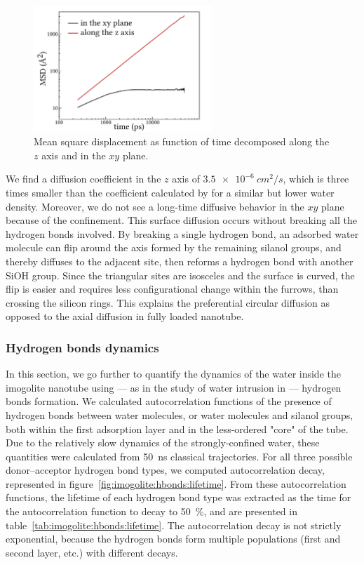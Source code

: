 \documentclass[thesis]{subfiles}
\begin{document}
\begin{figure}[ht]
    \centering
    \includegraphics[width=0.6\textwidth]{figures/images/imogolite-msd}
    \caption{Mean square displacement as function of time decomposed along the
    $z$ axis and in the $xy$ plane.}
    \label{fig:imogolite:msd}
\end{figure}

We find a diffusion coefficient in the $z$ axis of $\SI{3.5e-6}{cm^2/s}$, which
is three times smaller than the coefficient calculated by
\citeauthor{Zang2009}\cite{Zang2009} for a similar but lower water density.
Moreover, we do not see a long-time diffusive behavior in the $xy$ plane because
of the confinement. This surface diffusion occurs without breaking all the
hydrogen bonds involved. By breaking a single hydrogen bond, an adsorbed water
molecule can flip around the axis formed by the remaining silanol groups, and
thereby diffuses to the adjacent site, then reforms a hydrogen bond with another
SiOH group. Since the triangular sites are isosceles and the surface is curved,
the flip is easier and requires less configurational change within the furrows,
than crossing the silicon rings. This explains the preferential circular
diffusion as opposed to the axial diffusion in fully loaded nanotube.

\subsubsection{Hydrogen bonds dynamics}

In this section, we go further to quantify the dynamics of the water inside the
imogolite nanotube using --- as in the study of water intrusion in  ---
hydrogen bonds formation. We calculated autocorrelation functions of the
presence of hydrogen bonds between water molecules, or water molecules and
silanol groups, both within the first adsorption layer and in the less-ordered
"core" of the tube. Due to the relatively slow dynamics of the strongly-confined
water, these quantities were calculated from \SI{50}{ns} classical trajectories.
For all three possible donor--acceptor hydrogen bond types, we computed
autocorrelation decay, represented in
figure~\ref{fig:imogolite:hbonds:lifetime}. From these autocorrelation
functions, the lifetime of each hydrogen bond type was extracted as the time for
the autocorrelation function to decay to 50~\%, and are presented in
table~\ref{tab:imogolite:hbonds:lifetime}. The autocorrelation decay is not
strictly exponential, because the hydrogen bonds form multiple populations
(first and second layer, etc.) with different decays.
\end{document}
